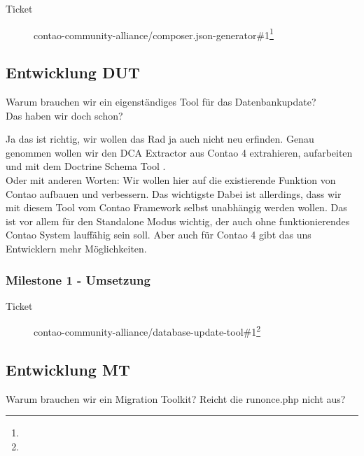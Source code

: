 \documentclass[
paper=a4,
draft=false,%
fontsize=10pt%
]{scrartcl}
\begin{document}
\begin{description}
\item[Ticket] contao-community-alliance/composer.json-generator\#1\footnote{}
\end{description}

\subsection{Entwicklung DUT}
\label{subsec:dut}

\begin{emquotation}
Warum brauchen wir ein eigenständiges Tool für das Datenbankupdate? \\
\hspace*{\fill}Das haben wir doch schon?
\end{emquotation}

Ja das ist richtig, wir wollen das Rad ja auch nicht neu erfinden. Genau genommen wollen wir den DCA Extractor aus Contao 4 extrahieren, aufarbeiten und mit dem Doctrine Schema Tool .\\
Oder mit anderen Worten: Wir wollen hier auf die existierende Funktion von Contao aufbauen und verbessern. Das wichtigste Dabei ist allerdings, dass wir mit diesem Tool vom Contao Framework selbst unabhängig werden wollen. Das ist vor allem für den Standalone Modus wichtig, der auch ohne funktionierendes Contao System lauffähig sein soll. Aber auch für Contao 4 gibt das uns Entwicklern mehr Möglichkeiten.

\subsubsection{Milestone 1 - Umsetzung}
\label{subsec:dut-milestone-1}

\begin{description}
\item[Ticket] contao-community-alliance/database-update-tool\#1\footnote{}
\end{description}

\subsection{Entwicklung MT}

\begin{emquotation}
Warum brauchen wir ein Migration Toolkit? Reicht die runonce.php nicht aus?
\end{emquotation}
\end{document}
